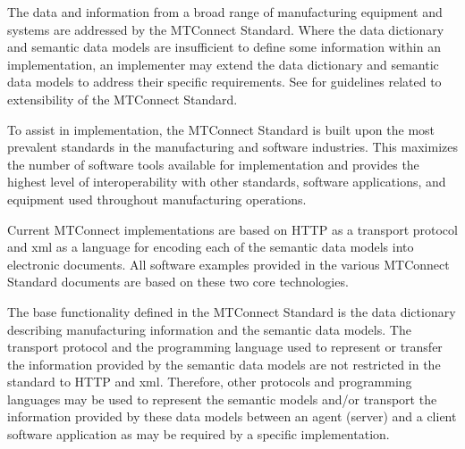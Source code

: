 The data and information from a broad range of manufacturing equipment and systems are addressed by the MTConnect Standard.  Where the \gls{data dictionary} and \glspl{semantic data model} are insufficient to define some information within an implementation, an implementer may extend the \gls{data dictionary} and \glspl{semantic data model} to address their specific requirements.  See  for guidelines related to extensibility of the MTConnect Standard.

To assist in implementation, the MTConnect Standard is built upon the most prevalent standards in the manufacturing and software industries.  This maximizes the number of software tools available for implementation and provides the highest level of interoperability with other standards, software applications, and equipment used throughout manufacturing operations.  

Current MTConnect implementations are based on HTTP as a transport protocol and \gls{xml} as a language for encoding each of the \glspl{semantic data model} into electronic documents.  All software examples provided in the various MTConnect Standard documents are based on these two core technologies.  

The base functionality defined in the MTConnect Standard is the \gls{data dictionary} describing manufacturing information and the \glspl{semantic data model}.  The transport protocol and the programming language used to represent or transfer the information provided by the \glspl{semantic data model} are not restricted in the standard to HTTP and \gls{xml}.  Therefore, other protocols and programming languages may be used to represent the semantic models and/or transport the information provided by these data models between an \gls{agent} (server) and a client software application as may be required by a specific implementation.

